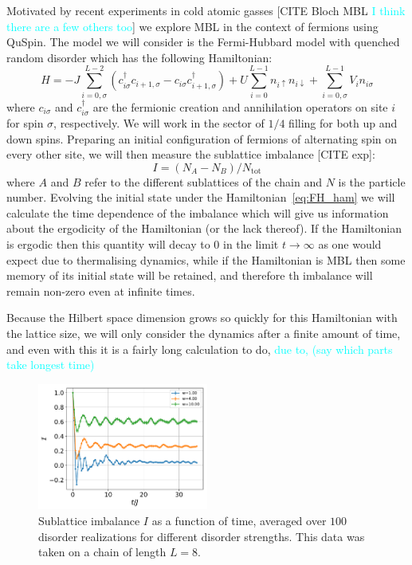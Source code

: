 \documentclass{SciPost}
\newcommand\0{\scalebox{-1}[1]{0}}
\newcommand*{\cyan}{\textcolor{cyan}}
\begin{document}
Motivated by recent experiments in cold atomic gasses [CITE Bloch MBL \cyan{I think there are a few others too}] we explore MBL in the context of fermions using QuSpin. The model we will consider is the Fermi-Hubbard model with quenched random disorder which has the following Hamiltonian:
\begin{equation}
	H = -J\sum_{i=0,\sigma}^{L-2} \left(c^\dagger_{i\sigma}c_{i+1,\sigma} - c_{i\sigma}c^\dagger_{i+1,\sigma}\right) +U\sum_{i=0}^{L-1} n_{i\uparrow }n_{i\downarrow } + \sum_{i=0,\sigma}^{L-1} V_i n_{i\sigma}\label{eq:FH_ham}
\end{equation}
where $c_{i\sigma }$ and $c^\dagger_{i\sigma }$ are the fermionic creation and annihilation operators on site $i$ for spin $\sigma$, respectively. We will work in the sector of $1/4$ filling for both up and down spins. Preparing an initial configuration of fermions of alternating spin on every other site, we will then measure the sublattice imbalance [CITE exp]:
\begin{equation}
	I = (N_A-N_B)/N_\mathrm{tot}
\end{equation}
where $A$ and $B$ refer to the different sublattices of the chain and $N$ is the particle number. Evolving the initial state under the Hamiltonian~\eqref{eq:FH_ham} we will calculate the time dependence of the imbalance which will give us information about the ergodicity of the Hamiltonian (or the lack thereof). If the Hamiltonian is ergodic then this quantity will decay to $0$ in the limit $t\rightarrow\infty$ as one would expect due to thermalising dynamics, while if the Hamiltonian is MBL then some memory of its initial state will be retained, and therefore th imbalance will remain non-zero even at infinite times.

Because the Hilbert space dimension grows so quickly for this Hamiltonian with the lattice size, we will only consider the dynamics after a finite amount of time, and even with this it is a fairly long calculation to do, \cyan{due to, (say which parts take longest time)} 

\begin{figure}[t!]
	\centering
	\includegraphics[width=0.5\textwidth]{fermion_MBL.pdf}
	\caption{\label{fig:MBL} Sublattice imbalance $I$ as a function of time, averaged over $100$ disorder realizations for different disorder strengths. This data was taken on a chain of length $L=8$.}
\end{figure}
\end{document}
